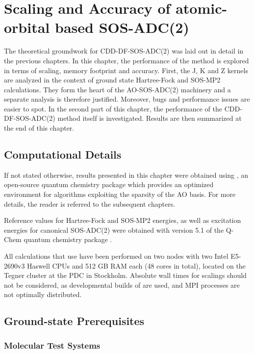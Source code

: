 \chapter{Scaling and Accuracy of atomic-orbital based SOS-ADC(2) \label{cha:RESULTS}}

The theoretical groundwork for CDD-DF-SOS-ADC(2) was laid out in detail in the previous chapters. In this chapter, the performance of the method is explored in terms of scaling, memory footprint and accuracy. First, the J, K and Z kernels are analyzed in the context of ground state Hartree-Fock and SOS-MP2 calculations. They form the heart of the AO-SOS-ADC(2) machinery and a separate analysis is therefore justified. Moreover, bugs and performance issues are easier to spot. In the second part of this chapter, the performance of the CDD-DF-SOS-ADC(2) method itself is investigated. Results are then summarized at the end of this chapter. 

\section{Computational Details}

If not stated otherwise, results presented in this chapter were obtained using \mchem{}, an open-source quantum chemistry package which provides an optimized environment for algorithms exploiting the sparsity of the AO basis. For more details, the reader is referred to the subsequent chapters.

Reference values for Hartree-Fock and SOS-MP2 energies, as well as excitation energies for canonical SOS-ADC(2) were obtained with version 5.1 of the Q-Chem quantum chemistry package \cite{Sha2015}.

All calculations that use \mchem{} have been performed on two nodes with two Intel E5-2690v3 Haswell CPUs and 512 GB RAM each (48 cores in total), located on the Tegner cluster at the PDC in Stockholm. Absolute wall times for scalings should not be considered, as developmental builds of \mchem{} are used, and MPI processes are not optimally distributed.  

\section{Ground-state Prerequisites}

\subsection{Molecular Test Systems}

